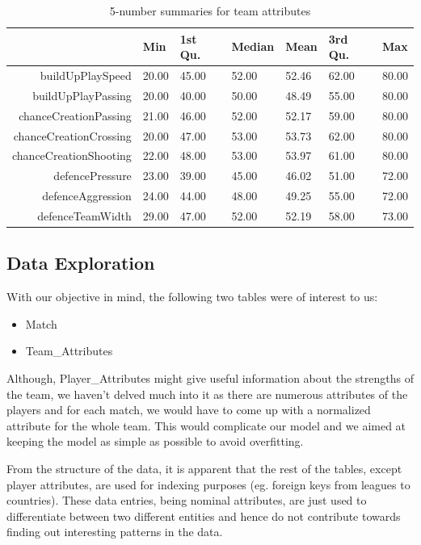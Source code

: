 \documentclass[11pt]{article}
\begin{document}
\begin{table}[ht]
\centering
\begin{tabular}{rllllll}
  \hline
                 & Min     & 1st Qu. & Median  & Mean    & 3rd Qu. & Max \\
  \hline
buildUpPlaySpeed & 20.00   & 45.00   & 52.00   & 52.46   & 62.00   & 80.00   \\
  buildUpPlayPassing & 20.00   & 40.00   & 50.00   & 48.49   & 55.00   & 80.00   \\
  chanceCreationPassing & 21.00   & 46.00   & 52.00   & 52.17   & 59.00   & 80.00   \\
  chanceCreationCrossing & 20.00   & 47.00   & 53.00   & 53.73   & 62.00   & 80.00   \\
  chanceCreationShooting & 22.00   & 48.00   & 53.00   & 53.97   & 61.00   & 80.00   \\
  defencePressure & 23.00   & 39.00   & 45.00   & 46.02   & 51.00   & 72.00   \\
  defenceAggression & 24.00   & 44.00   & 48.00   & 49.25   & 55.00   & 72.00   \\
  defenceTeamWidth & 29.00   & 47.00   & 52.00   & 52.19   & 58.00   & 73.00   \\
   \hline
\end{tabular}
\caption{5-number summaries for team attributes}
\label{tab:desc-stat}
\end{table}

\subsection{Data Exploration}
With our objective in mind, the following two tables were of interest to us:
\begin{itemize}
  \setlength\itemsep{0em}
  \item Match
  \item Team\_Attributes
\end{itemize}
Although, Player\_Attributes might give useful information about the strengths of the team, we haven't delved much into it as there are numerous attributes of the players and for each match, we would have to come up with a normalized attribute for the whole team. This would complicate our model and we aimed at keeping the model as simple as possible to avoid overfitting.

From the structure of the data, it is apparent that the rest of the tables, except player attributes, are used for indexing purposes (eg. foreign keys from leagues to countries).
These data entries, being nominal attributes, are just used to differentiate between two different entities and hence do not contribute towards finding out interesting patterns in the data.
\end{document}
